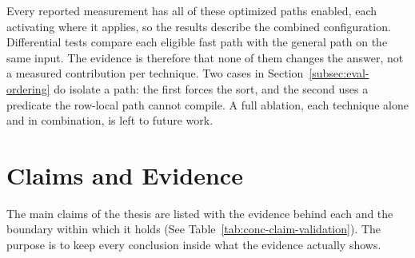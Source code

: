 Every reported measurement has all of these optimized paths enabled,
each activating where it applies, so the results describe the combined
configuration.  Differential tests compare each eligible fast path with
the general path on the same input.  The evidence is therefore that
none of them changes the answer, not a measured contribution per
technique.  Two cases in Section~\ref{subsec:eval-ordering} do isolate
a path: the first forces the sort, and the second uses a predicate the
row-local path cannot compile.  A full ablation, each technique alone and in
combination, is left to future work.

\section{Claims and Evidence}
\label{sec:conc-validation}

The main claims of the thesis are listed with the evidence behind each and
the boundary within which it holds (See
Table~\ref{tab:conc-claim-validation}).  The purpose is to keep every
conclusion inside what the
evidence actually shows.

